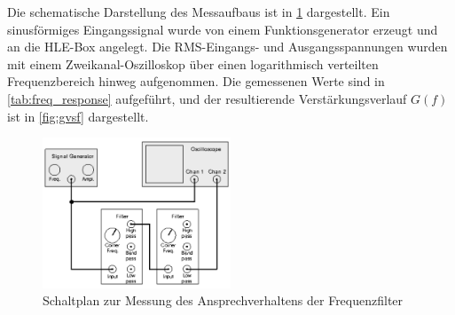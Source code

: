Die schematische Darstellung des Messaufbaus ist in \cref{fig:schaltfrequenz} dargestellt. 
Ein sinusförmiges Eingangssignal wurde von einem Funktionsgenerator erzeugt und an die HLE-Box angelegt. 
Die RMS-Eingangs- und Ausgangsspannungen wurden mit einem Zweikanal-Oszilloskop über einen logarithmisch verteilten Frequenzbereich hinweg aufgenommen. 
Die gemessenen Werte sind in \cref{tab:freq_response} aufgeführt, und der resultierende Verstärkungsverlauf $G(f)$ ist in \cref{fig:gvsf} dargestellt.


\begin{figure}[htbp]
    \centering
    \includegraphics[width=0.5\textwidth]{figs/schalt frequenz.png}
    \caption{Schaltplan zur Messung des Ansprechverhaltens der Frequenzfilter \cite{praktikum}}
    \label{fig:schaltfrequenz}
\end{figure}


